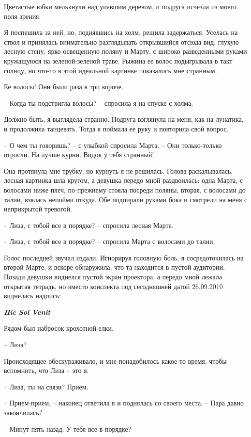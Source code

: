 \documentclass[
]{book}
\begin{document}
Цветастые юбки мелькнули над упавшим деревом, и подруга исчезла из моего поля зрения.

Я поспешила за ней, но, поднявшись на холм, решила задержаться. Уселась на ствол и принялась внимательно разглядывать открывшийся отсюда вид: глухую лесную стену, ярко освещенную поляну и Марту, с широко разведенными руками кружащуюся на зеленой-зеленой траве. Рыжина ее волос подыгрывала в такт солнцу, но что-то в этой идеальной картинке показалось мне странным.

Ее волосы! Они были раза в три короче.

-- Когда ты подстригла волосы? -- спросила я на спуске с холма.

Должно быть, я выглядела странно. Подруга взглянула на меня, как на лунатика, и продолжила танцевать. Тогда я поймала ее руку и повторила свой вопрос.

-- О чем ты говоришь? -- с улыбкой спросила Марта. -- Они только-только отросли. На лучше курни. Видок у тебя странный!

Она протянула мне трубку, но курнуть я не решилась. Голова раскалывалась, лесная картинка шла кругом, а девушка передо мной раздвоилась: одна Марта, с волосами ниже плеч, по-прежнему стояла посреди поляны, вторая, с волосами до талии, взялась непойми откуда. Обе подпирали руками бока и смотрели на меня с неприкрытой тревогой.

-- Лиза, с тобой все в порядке? -- спросила лесная Марта.

-- Лиза, с тобой все в порядке? -- спросила Марта с волосами до талии.

Голос последней звучал издали. Игнорируя головную боль, я сосредоточилась на второй Марте, и вскоре обнаружила, что та находится в пустой аудитории. Позади девушки виднелся пустой экран проектора, а передо мной лежала открытая тетрадь, но вместо конспекта под сегодняшней датой 26.09.2010 виднелась надпись:

\emph{\textbf{Hic Sol Venit}}

Рядом был набросок крохотной елки.

-- Лиза?

Происходящее обескураживало, и мне понадобилось какое-то время, чтобы вспомнить, что Лиза -- это я.

-- Лиза, ты на связи? Прием.

-- Прием-прием, -- наконец ответила я и поднялась со своего места. -- Пара давно закончилась?

-- Минут пять назад. У тебя все в порядке?
\end{document}
